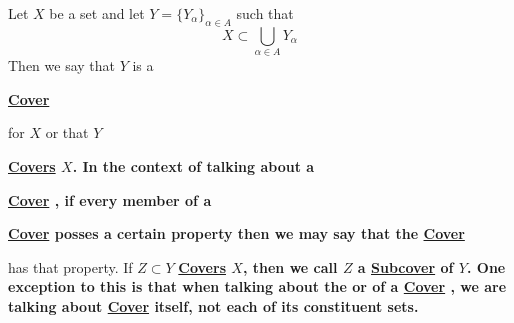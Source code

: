 \newcommand{\Cover}[0]{
    \bf \hyperref[def:Cover]{Cover} \rm
}
\newcommand{\Covers}[0]{
    \bf \hyperref[def:Cover]{Covers} \rm
}
\newcommand{\Subcover}[0]{
    \bf \hyperref[def:Cover]{Subcover} \rm
}
\newcommand{\Subcovers}[0]{
    \bf \hyperref[def:Cover]{Subcovers} \rm
}\begin{df}
\label{def:Cover}
\rm
    Let $X$ be a set and let 
    $Y=\{Y_\alpha\}_{\alpha \in A}$ 
    such that 
    \begin{equation*}
        X \subset \bigcup_{\alpha \in A} Y_{\alpha}
    \end{equation*}
    Then we say that 
    $Y$ 
    is a 
    \Cover
    for $X$ 
    or that $Y$ 
    \Covers $X$. 
    In the context of talking about a 
    \Cover, if every member of a 
    \Cover posses a certain property
    then we may say that the \Cover 
    has that property. 
    If $Z \subset Y$ \Covers $X$, then
    we call $Z$ a \Subcover of $Y$. 
    One exception to this is that 
    when talking about the 
    \Cardinality
    or \Disjointedness 
    of a \Cover, we are 
    talking about \Cover itself, 
    not each of its constituent sets. 
\end{df}

